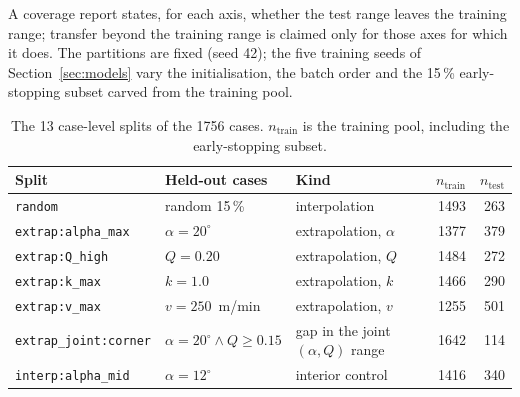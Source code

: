 \documentclass[subscriptcorrection,upint,varvw,barcolor=Goldenrod3,mathalfa=cal=euler,balance,hyphenate,french,pdf-a]{asmejour} %
\begin{document}
A coverage report states, for each axis, whether the test range leaves the training range; transfer beyond the training range is claimed only for those axes for which it does. %
The partitions are fixed (seed 42); the five training seeds of Section~\ref{sec:models} vary the initialisation, the batch order and the 15\,\% early-stopping subset carved from the training pool. %

\begin{table}[htbp]
\centering\small
\caption{The 13 case-level splits of the 1756 cases. $n_\text{train}$ is the training pool, including the early-stopping subset.} %
\label{tab:splits}
\begin{tabular}{@{}lllrr@{}}
\toprule
Split & Held-out cases & Kind & $n_\text{train}$ & $n_\text{test}$ \\
\midrule
\texttt{random}              & random 15\,\%                         & interpolation           & 1493 & 263 \\ %
\texttt{extrap:alpha\_max}   & $\alpha = 20^\circ$                   & extrapolation, $\alpha$ & 1377 & 379 \\ %
\texttt{extrap:Q\_high}      & $Q = 0.20$                            & extrapolation, $Q$      & 1484 & 272 \\ %
\texttt{extrap:k\_max}       & $k = 1.0$                             & extrapolation, $k$      & 1466 & 290 \\ %
\texttt{extrap:v\_max}       & $v = 250$~m/min                       & extrapolation, $v$      & 1255 & 501 \\ %
\texttt{extrap\_joint:corner}& $\alpha = 20^\circ \wedge Q \ge 0.15$ & gap in the joint $(\alpha, Q)$ range & 1642 & 114 \\ %
\texttt{interp:alpha\_mid}   & $\alpha = 12^\circ$                   & interior control        & 1416 & 340 \\ %

\end{tabular}
\end{table}
\end{document}

